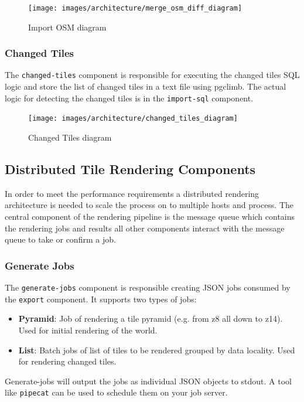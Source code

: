 \begin{figure}[H]
  \centering
  \texttt{[image: images/architecture/merge\_osm\_diff\_diagram]}
  \caption{Import OSM diagram}
\end{figure}

\subsubsection{Changed Tiles}

The \texttt{changed-tiles} component is responsible for executing the changed tiles SQL logic and store the list of changed tiles in a text file using pgclimb. The actual logic for detecting the changed tiles is in the \texttt{import-sql} component.

\begin{figure}[H]
  \centering
  \texttt{[image: images/architecture/changed\_tiles\_diagram]}
  \caption{Changed Tiles diagram}
\end{figure}

\subsection{Distributed Tile Rendering Components}

In order to meet the performance requirements a distributed rendering architecture 
is needed to scale the process on to multiple hosts and process. The central component of the rendering pipeline is the message queue which contains the rendering jobs and results all other components interact with the message queue to take or confirm a job.

\subsubsection{Generate Jobs}

The \texttt{generate-jobs} component is responsible creating JSON jobs consumed by the \texttt{export} component. It supports two types of jobs:

\begin{itemize}
  \item \textbf{Pyramid}: Job of rendering a tile pyramid (e.g. from z8 all down to z14). Used for initial rendering of the world.
  \item \textbf{List}: Batch jobs of list of tiles to be rendered grouped by data locality. Used for rendering changed tiles.
\end{itemize}

Generate-jobs will output the jobs as individual JSON objects to stdout. A tool like \texttt{pipecat} can be used to schedule them on your job server.

